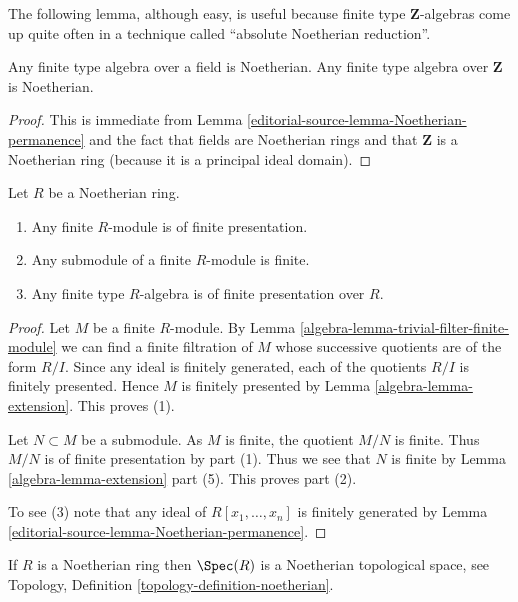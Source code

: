 \noindent
The following lemma, although easy, is useful because
finite type $\mathbf{Z}$-algebras come up quite often in
a technique called ``absolute Noetherian reduction''.

\begin{lemma}
\label{editorial-source-lemma-obvious-Noetherian}
Any finite type algebra over a field is Noetherian.
Any finite type algebra over $\mathbf{Z}$ is Noetherian.
\end{lemma}

\begin{proof}
This is immediate from Lemma \ref{editorial-source-lemma-Noetherian-permanence}
and the fact that fields are Noetherian rings and that
$\mathbf{Z}$ is a Noetherian ring (because it is a
principal ideal domain).
\end{proof}

\begin{lemma}
\label{editorial-source-lemma-Noetherian-finite-type-is-finite-presentation}
Let $R$ be a Noetherian ring.
\begin{enumerate}
\item Any finite $R$-module is of finite presentation.
\item Any submodule of a finite $R$-module is finite.
\item Any finite type $R$-algebra is of finite presentation over $R$.
\end{enumerate}
\end{lemma}

\begin{proof}
Let $M$ be a finite $R$-module. By
Lemma \ref{algebra-lemma-trivial-filter-finite-module}
we can find a finite filtration of $M$ whose successive quotients are
of the form $R/I$. Since any ideal is finitely generated, each of
the quotients $R/I$ is finitely presented. Hence $M$ is finitely
presented by
Lemma \ref{algebra-lemma-extension}.
This proves (1).

\medskip\noindent
Let $N \subset M$ be a submodule. As $M$ is finite, the quotient
$M/N$ is finite. Thus $M/N$ is of finite presentation by part (1).
Thus we see that $N$ is finite by Lemma \ref{algebra-lemma-extension} part (5).
This proves part (2).

\medskip\noindent
To see (3) note that any ideal of
$R[x_1, \ldots, x_n]$ is finitely generated by
Lemma \ref{editorial-source-lemma-Noetherian-permanence}.
\end{proof}

\begin{lemma}
\label{editorial-source-lemma-Noetherian-topology}
If $R$ is a Noetherian ring then $\Spec(R)$
is a Noetherian topological space, see Topology,
Definition \ref{topology-definition-noetherian}.
\end{lemma}

